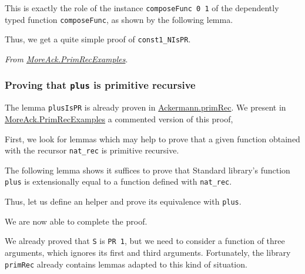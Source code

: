 This is exactly the role of the instance \texttt{composeFunc 0 1} of the dependently typed
function \texttt{composeFunc}, as shown by the following lemma.

\vspace{4pt}



\vspace{4pt}
Thus, we get a quite simple proof of \texttt{const1\_NIsPR}.


\vspace{4pt}
\noindent
\emph{From \href{../theories/html/hydras.MoreAck.PrimRecExamples.html}{MoreAck.PrimRecExamples}}.



\subsubsection{Proving that \texttt{plus} is primitive recursive}

The lemma \texttt{plusIsPR} is already proven in \href{../theories/html/hydras.Ackermann.primRec.html}{Ackermann.primRec}. We present in 
\href{../theories/html/hydras.MoreAck.PrimRecExamples.html}{MoreAck.PrimRecExamples}
a commented version of this proof, 

First, we look for lemmas which may help to prove that a given function obtained with the recursor \texttt{nat\_rec} is primitive recursive.



The following lemma shows it suffices to prove that
Standard library's function \texttt{plus} is extensionally equal to a function defined with
\texttt{nat\_rec}.



Thus, let us define an helper and prove its equivalence with \texttt{plus}.




\vspace{4pt}


We are now able to complete the proof.




We already proved that \texttt{S} is \texttt{PR 1}, but we need to consider a function of three arguments, which ignores its first and third arguments.
Fortunately, the library \texttt{primRec} already contains lemmas adapted to this kind of situation.


